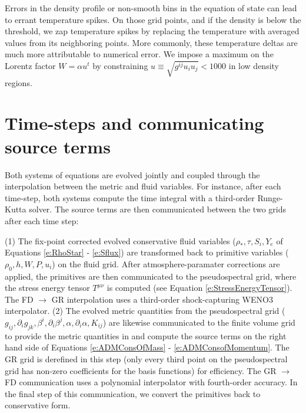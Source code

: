 Errors in the density profile or non-smooth bins in the equation of state can lead to errant temperature spikes.
On those grid points, and if the density is below the threshold, we zap temperature spikes by replacing the temperature with averaged values from its neighboring points.
More commonly, these temperature deltas are much more attributable to numerical error.
We impose a maximum on the Lorentz factor $W = \alpha u^t$ by constraining $u \equiv \sqrt{g^{ij} u_i u_j} < 1000$ in low density regions.


\section{Time-steps and communicating source terms}
\label{sec:communication}

Both systems of equations are evolved jointly and coupled through the interpolation between the metric and fluid variables. 
For instance, after each time-step, both systems compute the time integral with a third-order Runge-Kutta solver.
The source terms are then communicated between the two grids after each time step:

(1) The fix-point corrected evolved conservative fluid variables ($\rho_*, \tau, S_i, Y_e$ of Equations \ref{e:RhoStar} - \ref{e:Sflux}) are transformed back to primitive variables ($\rho_0, h, W, P, u_i$) on the fluid grid.  After atmosphere-paramater corrections are applied, the primitives are then communicated to the pseudospectral grid, where the stress energy tensor $T^{\mu\nu}$ is computed (see Equation \ref{e:StressEnergyTensor}).  The FD $\rightarrow$ GR interpolation uses a third-order shock-capturing WENO3 interpolator. 
(2) The evolved metric quantities from the pseudospectral grid ($g_{ij}, \partial_i g_{jk}, \beta^i, \partial_i \beta^j, \alpha, \partial_i \alpha,  K_{ij}$) are likewise communicated to the finite volume grid to provide the metric quantities in and compute the source terms on the right hand side of Equations \ref{e:ADMConsOfMass} - \ref{e:ADMConsofMomentum}.  The GR grid is derefined in this step (only every third point on the pseudospectral grid has non-zero coefficients for the basis functions) for efficiency.  The GR $\rightarrow$ FD communication uses a polynomial interpolator with fourth-order accuracy.
In the final step of this communication, we convert the primitives back to conservative form.

